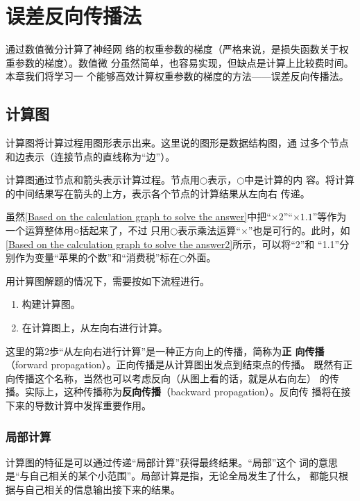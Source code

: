 \chapter{误差反向传播法}
通过数值微分计算了神经网
络的权重参数的梯度（严格来说，是损失函数关于权重参数的梯度）。数值微
分虽然简单，也容易实现，但缺点是计算上比较费时间。本章我们将学习一
个能够高效计算权重参数的梯度的方法——误差反向传播法。
\section{计算图}
计算图将计算过程用图形表示出来。这里说的图形是数据结构图，通
过多个节点和边表示（连接节点的直线称为“边”）。

计算图通过节点和箭头表示计算过程。节点用$\bigcirc$表示，$\bigcirc$中是计算的内
容。将计算的中间结果写在箭头的上方，表示各个节点的计算结果从左向右
传递。


虽然\autoref{Based on the calculation graph to solve the answer}中把“$\times 2$”“$\times 1.1$”等作为一个运算整体用○括起来了，不过
只用$\bigcirc$表示乘法运算“$\times$”也是可行的。此时，如\autoref{Based on the calculation graph to solve the answer2}所示，可以将“2”和
“1.1”分别作为变量“苹果的个数”和“消费税”标在$\bigcirc$外面。


用计算图解题的情况下，需要按如下流程进行。
\begin{enumerate}
    \item 构建计算图。
    \item 在计算图上，从左向右进行计算。
\end{enumerate}

这里的第2歩“从左向右进行计算”是一种正方向上的传播，简称为\textbf{正
    向传播}（forward propagation）。正向传播是从计算图出发点到结束点的传播。
既然有正向传播这个名称，当然也可以考虑反向（从图上看的话，就是从右向左）
的传播。实际上，这种传播称为\textbf{反向传播}（backward propagation）。反向传
播将在接下来的导数计算中发挥重要作用。

\subsection{局部计算}
计算图的特征是可以通过传递“局部计算”获得最终结果。“局部”这个
词的意思是“与自己相关的某个小范围”。局部计算是指，无论全局发生了什么，
都能只根据与自己相关的信息输出接下来的结果。

